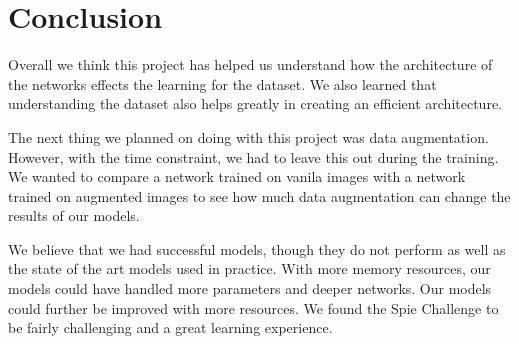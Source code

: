 \documentclass[11pt]{ieeeconf}
\begin{document}
\section{Conclusion}
Overall we think this project has helped us understand how the architecture of the networks effects the learning for the dataset. We also learned that understanding the dataset also helps greatly in creating an efficient architecture. 

The next thing we planned on doing with this project was data augmentation. However, with the time constraint, we had to leave this out during the training. We wanted to compare a network trained on vanila images with a network trained on augmented images to see how much data augmentation can change the results of our models. 

We believe that we had successful models, though they do not perform as well as the state of the art models used in practice. With more memory resources, our models could have handled more parameters and deeper networks. Our models could further be improved with more resources. We found the Spie Challenge to be fairly challenging and a great learning experience.

\nocite{*}


\end{document}

